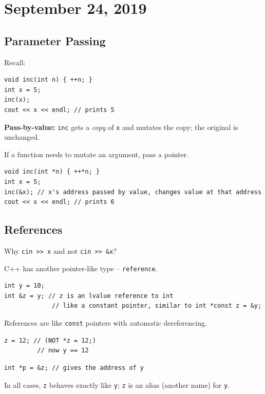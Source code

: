 \documentclass[11pt]{article}
\theoremstyle{definition}
\begin{document}
\section{September 24, 2019}

\subsection{Parameter Passing}
Recall:
\begin{lstlisting}
void inc(int n) { ++n; }
int x = 5;
inc(x);
cout << x << endl; // prints 5
\end{lstlisting}
{\bf Pass-by-value:} {\tt inc} gets a {\it copy} of {\tt x} and mutates the copy; the original is unchanged.

If a function needs to mutate an argument, pass a pointer.
\begin{lstlisting}
void inc(int *n) { ++*n; }
int x = 5;
inc(&x); // x's address passed by value, changes value at that address
cout << x << endl; // prints 6
\end{lstlisting}

\subsection{References}
Why {\tt cin >\null> x} and not {\tt cin >\null> \&x}?

C++ has another pointer-like type -- {\tt reference}.
\begin{lstlisting}
int y = 10;
int &z = y; // z is an lvalue reference to int
             // like a constant pointer, similar to int *const z = &y;
\end{lstlisting}
References are like {\tt const} pointers with automatic dereferencing.
\begin{lstlisting}
z = 12; // (NOT *z = 12;)
         // now y == 12
\end{lstlisting}
\begin{lstlisting}
int *p = &z; // gives the address of y
\end{lstlisting}
In all cases, {\tt z} behaves exactly like {\tt y}; {\tt z} is an alias (another name) for {\tt y}. 
\end{document}
